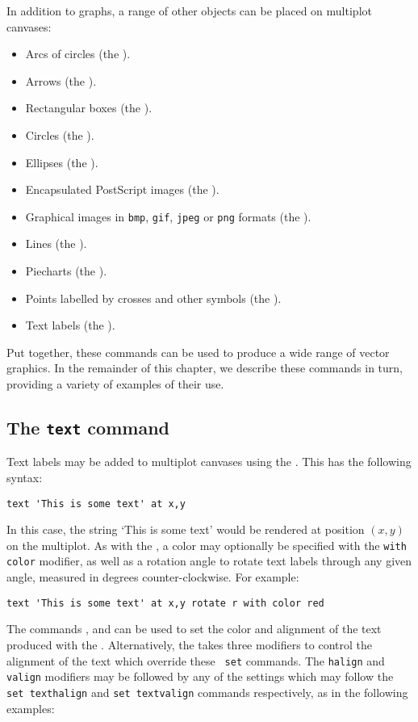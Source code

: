 In addition to graphs, a range of other objects can be placed on multiplot
canvases:
\begin{itemize}
\item Arcs of circles (the ).
\item Arrows (the ).
\item Rectangular boxes (the ).
\item Circles (the ).
\item Ellipses (the ).
\item Encapsulated PostScript images (the ).
\item Graphical images in {\tt bmp}, {\tt gif}, {\tt jpeg} or {\tt png} formats (the ).
\item Lines (the ).
\item Piecharts (the ).
\item Points labelled by crosses and other symbols (the ).
\item Text labels (the ).
\end{itemize}
Put together, these commands can be used to produce a wide range of vector
graphics. In the remainder of this chapter, we describe these commands in turn,
providing a variety of examples of their use.

\subsection{The {\tt text} command}

Text labels may be added to multiplot canvases using the . This
has the following syntax:

\begin{verbatim}
text 'This is some text' at x,y
\end{verbatim}

In this case, the string `This is some text' would be rendered at position
$(x,y)$ on the multiplot. As with the , a color may
optionally be specified with the {\tt with color} modifier, as well as a
rotation angle to rotate text labels through any given angle, measured in
degrees counter-clockwise. For example:

\begin{verbatim}
text 'This is some text' at x,y rotate r with color red
\end{verbatim}

The commands ,  and
 can be used to set the color and alignment of the
text produced with the . Alternatively, the  takes
three modifiers to control the alignment of the text which override these {\tt
set} commands. The {\tt halign} and {\tt valign} modifiers may be followed by
any of the settings which may follow the {\tt set texthalign} and {\tt set
textvalign} commands respectively, as in the following examples:

